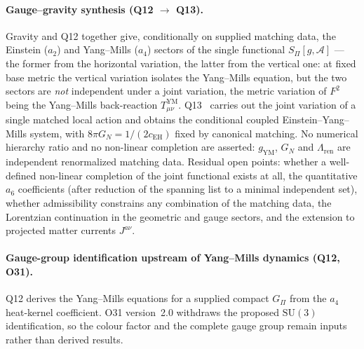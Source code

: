 \documentclass[11pt,a4paper]{article}
\newcommand{\SU}{\mathrm{SU}}
\begin{document}
  \paragraph{Gauge--gravity synthesis (Q12 $\to$ Q13).}
    Gravity and Q12 together give, conditionally on supplied matching data, the Einstein ($a_2$) and
    Yang--Mills ($a_4$) sectors of
    the single functional $S_\Pi[g,\mathcal{A}]$ --- the former from the horizontal variation, the
    latter from the vertical one: at fixed base metric the vertical variation
    isolates the Yang--Mills equation, but the two sectors are \emph{not} independent under a
    joint variation, the metric variation of $F^2$ being the Yang--Mills back-reaction
    $T^{\mathrm{YM}}_{\mu\nu}$.
    Q13~\cite{Beau2026q13} carries out the joint variation of a single matched local action and
    obtains the conditional coupled Einstein--Yang--Mills system, with
    $8\pi G_N = 1/(2c_{\mathrm{EH}})$ fixed by canonical matching. No numerical hierarchy ratio
    and no non-linear completion are asserted: $g_{\mathrm{YM}}$, $G_N$ and
    $\Lambda_{\mathrm{ren}}$ are independent renormalized matching data.
    Residual open points: whether a well-defined non-linear completion of the joint functional
    exists at all, the quantitative $a_6$ coefficients (after reduction of the spanning list to a
    minimal independent set), whether admissibility constrains any combination of the matching
    data, the Lorentzian continuation in the geometric and gauge sectors, and the extension to projected matter
    currents $J^{a\nu}$.

  \paragraph{Gauge-group identification upstream of Yang--Mills dynamics (Q12, O31).}
    Q12 derives the Yang--Mills equations for a supplied compact $G_\Pi$ from the $a_4$
    heat-kernel coefficient. O31 version~2.0 withdraws the proposed $\SU(3)$ identification, so
    the colour factor and the complete gauge group remain inputs rather than derived results.
\end{document}
